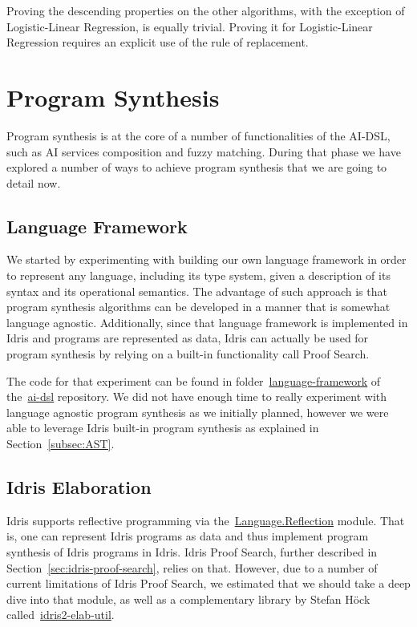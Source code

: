 \documentclass[]{report}
\begin{document}
Proving the descending properties on the other algorithms, with the
exception of Logistic-Linear Regression, is equally trivial.  Proving
it for Logistic-Linear Regression requires an explicit use of the rule
of replacement.

\chapter{Program Synthesis}
\label{chap:program_synthesis}

Program synthesis is at the core of a number of functionalities of the
AI-DSL, such as AI services composition and fuzzy matching.  During
that phase we have explored a number of ways to achieve program
synthesis that we are going to detail now.

\section{Language Framework}

We started by experimenting with building our own language framework
in order to represent any language, including its type system, given a
description of its syntax and its operational semantics.  The
advantage of such approach is that program synthesis algorithms can be
developed in a manner that is somewhat language agnostic.
Additionally, since that language framework is implemented in Idris
and programs are represented as data, Idris can actually be used for
program synthesis by relying on a built-in functionality call Proof
Search.

The code for that experiment can be found in
folder~\href{https://github.com/singnet/ai-dsl/blob/master/experimental/program-synthesis/language-framework}{language-framework}
of the~\href{https://github.com/singnet/ai-dsl}{ai-dsl} repository.
We did not have enough time to really experiment with language
agnostic program synthesis as we initially planned, however we were
able to leverage Idris built-in program synthesis as explained in
Section~\ref{subsec:AST}.

\section{Idris Elaboration}

Idris supports reflective programming via
the~\href{https://www.idris-lang.org/docs/idris2/current/base_docs/docs/Language.Reflection.html}{Language.Reflection}
module.  That is, one can represent Idris programs as data and thus
implement program synthesis of Idris programs in Idris.  Idris Proof
Search, further described in Section~\ref{sec:idris-proof-search},
relies on that.  However, due to a number of current limitations of
Idris Proof Search, we estimated that we should take a deep dive into
that module, as well as a complementary library by Stefan H\"ock
called~\href{https://github.com/stefan-hoeck/idris2-elab-util}{idris2-elab-util}.
\end{document}
